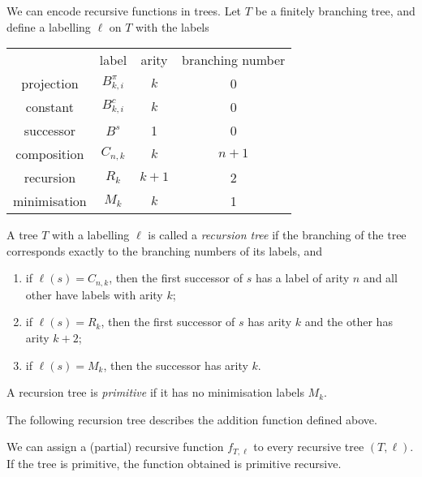 We can encode recursive functions in trees.
Let \( T \) be a finitely branching tree, and define a labelling \( \ell \) on \( T \) with the labels
\begin{center}
	\begin{tabular}{c c c c}
		& label & arity & branching number \\
		projection & \( B_{k,i}^\pi \) & \( k \) & 0 \\
		constant & \( B_{k,i}^c \) & \( k \) & 0 \\
		successor & \( B^s \) & 1 & 0 \\
		composition & \( C_{n,k} \) & \( k \) & \( n + 1 \) \\
		recursion & \( R_k \) & \( k + 1 \) & 2 \\
		minimisation & \( M_k \) & \( k \) & 1
	\end{tabular}
\end{center}
\begin{definition}
	A tree \( T \) with a labelling \( \ell \) is called a \emph{recursion tree} if the branching of the tree corresponds exactly to the branching numbers of its labels, and
	\begin{enumerate}
		\item if \( \ell(s) = C_{n,k} \), then the first successor of \( s \) has a label of arity \( n \) and all other have labels with arity \( k \);
		\item if \( \ell(s) = R_k \), then the first successor of \( s \) has arity \( k \) and the other has arity \( k + 2 \);
		\item if \( \ell(s) = M_k \), then the successor has arity \( k \).
	\end{enumerate}
	A recursion tree is \emph{primitive} if it has no minimisation labels \( M_k \).
\end{definition}
The following recursion tree describes the addition function defined above.
\begin{center}
\end{center}
We can assign a (partial) recursive function \( f_{T,\ell} \) to every recursive tree \( (T, \ell) \).
If the tree is primitive, the function obtained is primitive recursive.
